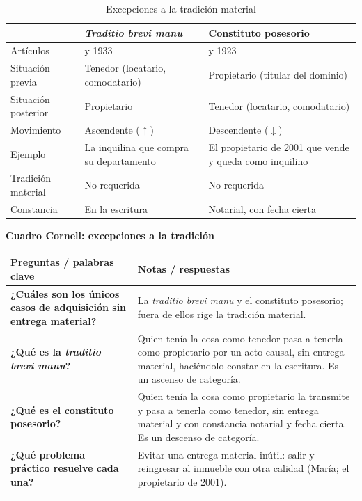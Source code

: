 \documentclass[12pt,oneside]{book}
\renewcommand{\arraystretch}{1.25}
\newcommand{\cq}[2]{\textbf{#1} & #2 \\[0.45em]}
\newcommand{\cornell}[3]{%
\par\bigskip\noindent\textbf{\large Cuadro Cornell: #1}\par\smallskip
\begin{center}
\small
\renewcommand{\arraystretch}{1.15}
\begin{tabularx}{\textwidth}{>{\raggedright\arraybackslash}p{0.27\textwidth}>{\raggedright\arraybackslash}X}
\toprule
\textbf{Preguntas / palabras clave} & \textbf{Notas / respuestas} \\
\midrule
#2
\midrule
\multicolumn{2}{p{\dimexpr\textwidth-2\tabcolsep\relax}}{\textbf{Resumen.} #3} \\
\bottomrule
\end{tabularx}
\end{center}
}
\begin{document}
\begin{table}[H]
\centering
\small
\begin{tabularx}{\textwidth}{>{\raggedright\arraybackslash}p{}>{\raggedright\arraybackslash}X>{\raggedright\arraybackslash}X}
\toprule
 & \textbf{\textit{Traditio brevi manu}} & \textbf{Constituto posesorio} \\
\midrule
Artículos & 1892 y 1933 & 1892 y 1923 \\
Situación previa & Tenedor (locatario, comodatario) & Propietario (titular del dominio) \\
Situación posterior & Propietario & Tenedor (locatario, comodatario) \\
Movimiento & Ascendente ($\uparrow$) & Descendente ($\downarrow$) \\
Ejemplo & La inquilina que compra su departamento & El propietario de 2001 que vende y queda como inquilino \\
Tradición material & No requerida & No requerida \\
Constancia & En la escritura & Notarial, con fecha cierta \\
\bottomrule
\end{tabularx}
\caption{Excepciones a la tradición material}
\end{table}

\cornell{excepciones a la tradición}{
\cq{¿Cuáles son los únicos casos de adquisición sin entrega material?}{La \textit{traditio brevi manu} y el constituto posesorio; fuera de ellos rige la tradición material.}
\cq{¿Qué es la \textit{traditio brevi manu}?}{Quien tenía la cosa como tenedor pasa a tenerla como propietario por un acto causal, sin entrega material, haciéndolo constar en la escritura. Es un ascenso de categoría.}
\cq{¿Qué es el constituto posesorio?}{Quien tenía la cosa como propietario la transmite y pasa a tenerla como tenedor, sin entrega material y con constancia notarial y fecha cierta. Es un descenso de categoría.}
\cq{¿Qué problema práctico resuelve cada una?}{Evitar una entrega material inútil: salir y reingresar al inmueble con otra calidad (María; el propietario de 2001).}
}{La tradición debe ser material y efectiva, salvo dos excepciones legales: la \textit{traditio brevi manu} (tenedor que pasa a propietario) y el constituto posesorio (propietario que pasa a tenedor), ambas con constancia en instrumento y sin movimiento material.}
\end{document}
